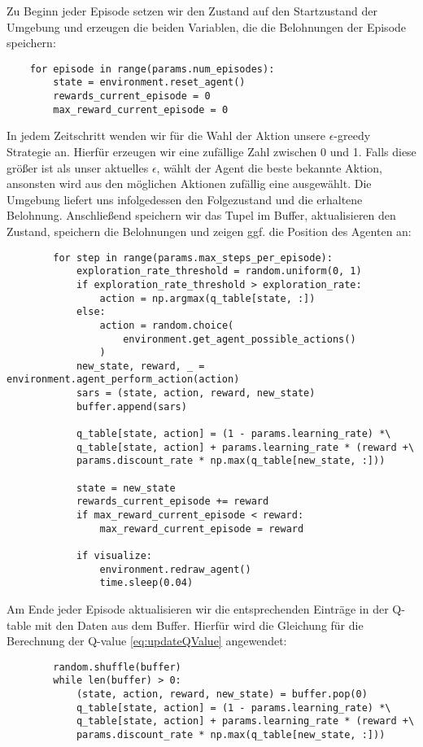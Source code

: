 Zu Beginn jeder Episode setzen wir den Zustand auf den Startzustand der Umgebung und erzeugen die beiden Variablen, die die Belohnungen der Episode speichern:
\begin{verbatim}
    for episode in range(params.num_episodes):
        state = environment.reset_agent()
        rewards_current_episode = 0
        max_reward_current_episode = 0
\end{verbatim}

In jedem Zeitschritt wenden wir für die Wahl der Aktion unsere $ \epsilon $-greedy Strategie an. Hierfür erzeugen wir eine zufällige Zahl zwischen 0 und 1. Falls diese größer ist als unser aktuelles $ \epsilon $, wählt der Agent die beste bekannte Aktion, ansonsten wird aus den möglichen Aktionen zufällig eine ausgewählt. Die Umgebung liefert uns infolgedessen den Folgezustand und die erhaltene Belohnung. Anschließend speichern wir das Tupel im Buffer, aktualisieren den Zustand, speichern die Belohnungen und zeigen ggf. die Position des Agenten an:
\begin{verbatim}
        for step in range(params.max_steps_per_episode):
            exploration_rate_threshold = random.uniform(0, 1)
            if exploration_rate_threshold > exploration_rate:
                action = np.argmax(q_table[state, :])
            else:
                action = random.choice(
                    environment.get_agent_possible_actions()
                )
            new_state, reward, _ = environment.agent_perform_action(action)
            sars = (state, action, reward, new_state)
            buffer.append(sars)

            q_table[state, action] = (1 - params.learning_rate) *\
            q_table[state, action] + params.learning_rate * (reward +\
            params.discount_rate * np.max(q_table[new_state, :]))

            state = new_state
            rewards_current_episode += reward
            if max_reward_current_episode < reward:
                max_reward_current_episode = reward

            if visualize:
                environment.redraw_agent()
                time.sleep(0.04)
\end{verbatim}

Am Ende jeder Episode aktualisieren wir die entsprechenden Einträge in der Q-table mit den Daten aus dem Buffer. Hierfür wird die Gleichung für die Berechnung der Q-value \ref{eq:updateQValue} angewendet:
\begin{verbatim}
        random.shuffle(buffer)
        while len(buffer) > 0:
            (state, action, reward, new_state) = buffer.pop(0)
            q_table[state, action] = (1 - params.learning_rate) *\
            q_table[state, action] + params.learning_rate * (reward +\
            params.discount_rate * np.max(q_table[new_state, :]))
\end{verbatim}

